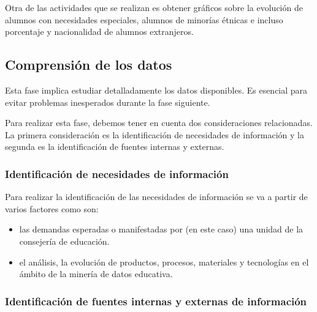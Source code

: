Otra de las actividades que se realizan es obtener gráficos sobre la evolución de alumnos con necesidades especiales, alumnos de minorías étnicas e incluso porcentaje y nacionalidad de alumnos extranjeros.

\subsection{Comprensión de los datos}
Esta fase implica estudiar detalladamente los datos disponibles. Es esencial para evitar problemas inesperados durante la fase siguiente.

Para realizar esta fase, debemos tener en cuenta dos consideraciones relacionadas. La primera consideración es la identificación de necesidades de información y la segunda es la identificación de fuentes internas y externas.

\subsubsection{Identificación de necesidades de información}

Para realizar la identificación de las necesidades de información se va a partir de varios factores como son:
\begin{itemize}
	\item las demandas esperadas o manifestadas por (en este caso) una unidad de la consejería de educación.
	\item el análisis, la evolución de productos, procesos, materiales y tecnologías en el ámbito de la minería de datos educativa.
\end{itemize}

\subsubsection{Identificación de fuentes internas y externas de información}

